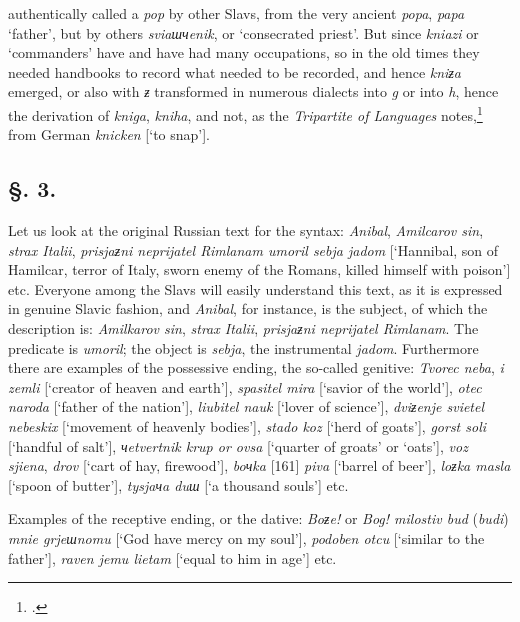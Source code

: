 authentically called a \textit{pop} by other Slavs, from the very ancient \textit{popa}, \textit{papa} ‘father’, but by others \textit{sviaшчenik}, or ‘consecrated priest’. But since \textit{kniazi} or ‘commanders’ have and have had many occupations, so in the old times they needed handbooks to record what needed to be recorded, and hence \textit{kniƶa} emerged, or also with \textit{ƶ} transformed in numerous dialects into \textit{g} or into \textit{h}, hence the derivation of \textit{kniga}, \textit{kniha}, and not, as the \textit{Tripartite of Languages} notes,{\enlargethispage{\baselineskip}\footnote{\citet{klaproth_tripartitum_1820}.}} from German \textit{knicken} [‘to snap’].

\subsection*{\hspace*{\fill}§. 3.\hspace*{\fill}}

Let us look at the original Russian text for the syntax: \textit{Anibal}, \textit{Amilcarov sin}, \textit{strax Italii}, \textit{prisjaƶni neprijatel Rimlanam umoril sebja jadom} [‘Hannibal, son of Hamilcar, terror of Italy, sworn enemy of the Romans, killed himself with poison’] etc. Everyone among the Slavs will easily understand this text, as it is expressed in genuine Slavic fashion, and \textit{Anibal}, for instance, is the subject, of which the description is: \textit{Amilkarov sin}, \textit{strax Italii}, \textit{prisjaƶni neprijatel Rimlanam}. The predicate is \textit{umoril}; the object is \textit{sebja}, the instrumental \textit{jadom}. Furthermore there are examples of the possessive ending, the so-called genitive: \textit{Tvorec neba}, \textit{i zemli} [‘creator of heaven and earth’], \textit{spasitel mira} [‘savior of the world’], \textit{otec naroda} [‘father of the nation’], \textit{liubitel nauk} [‘lover of science’], \textit{dviƶenje svietel nebeskix} [‘movement of heavenly bodies’], \textit{stado koz} [‘herd of goats’], \textit{gorst soli} [‘handful of salt’], \textit{чetvertnik krup or ovsa} [‘quarter of groats’ or ‘oats’], \textit{voz sjiena}, \textit{drov} [‘cart of hay, firewood’], \textit{boчka} [161] \textit{piva} [‘barrel of beer’], \textit{loƶka masla} [‘spoon of butter’], \textit{tysjaчa duш} [‘a thousand souls’] etc.

Examples of the receptive ending, or the dative: \textit{Boƶe!} or \textit{Bog! milostiv bud} (\textit{budi}) \textit{mnie grjeшnomu} [‘God have mercy on my soul’], \textit{podoben otcu} [‘similar to the father’], \textit{raven jemu lietam} [‘equal to him in age’] etc.

